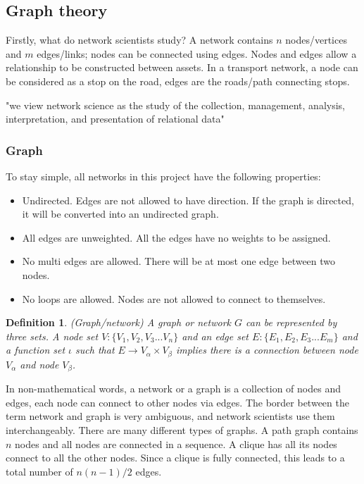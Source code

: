 \documentclass[12pt]{article}
\newtheorem{definition}{Definition}[section]
\begin{document}
\subsection{Graph theory}
Firstly, what do network scientists study? A network contains $n$ nodes/vertices and $m$ edges/links; nodes can be connected using edges. Nodes and edges allow a relationship to be constructed between assets. In a transport network, a node can be considered as a stop on the road, edges are the roads/path connecting stops.
\begin{center}
    "we view network science as the study of the collection,
    management, analysis, interpretation, and presentation of relational data" \cite{brandes_robins_mccranie_wasserman_2013}
\end{center}

\subsubsection{Graph}
\label{graph}
To stay simple, all networks in this project have the following properties:
\begin{itemize}
    \item Undirected. Edges are not allowed to have direction. If the graph is directed, it will be converted into an undirected graph.
    \item All edges are unweighted. All the edges have no weights to be assigned.
    \item No multi edges are allowed. There will be at most one edge between two nodes.
    \item No loops are allowed. Nodes are not allowed to connect to themselves. 
\end{itemize}
\begin{definition}{(Graph/network)}
    A graph or network $G$ can be represented by three sets. A node set $V:\{V_1,V_2,V_3...V_n\}$ and an edge set $E:\{E_1,E_2,E_3...E_m\}$ and a function set $\iota$ such that $E\rightarrow V_\alpha\times V_\beta$ implies there is a connection between node $V_\alpha$ and node $V_\beta$.
\end{definition}
\par
In non-mathematical words, a network or a graph is a collection of nodes and edges, each node can connect to other nodes via edges. The border between the term network and graph is very ambiguous, and network scientists use them interchangeably. There are many different types of graphs. A path graph contains $n$ nodes and all nodes are connected in a sequence. A clique has all its nodes connect to all the other nodes. Since a clique is fully connected, this leads to a total number of $n(n-1)/2$ edges.
\end{document}
